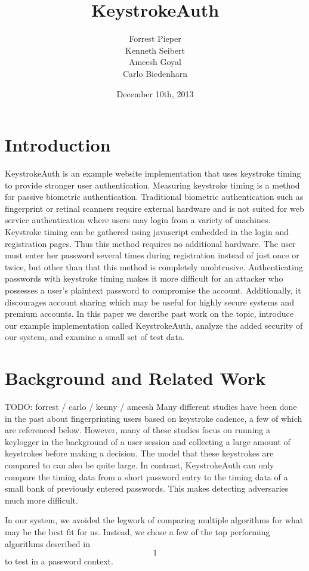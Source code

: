 \documentclass{article}
\title{KeystrokeAuth}
\author{
  Forrest Pieper\\
  Kenneth Seibert\\
  Ameesh Goyal\\
  Carlo Biedenharn
}
\date{December 10th, 2013}
\begin{document}
\maketitle

\abstract{
}

\section{Introduction}
\label{introduction}
KeystrokeAuth is an example website implementation that uses keystroke timing to provide stronger user authentication.
Measuring keystroke timing is a method for passive biometric authentication. 
Traditional biometric authentication such as fingerprint or retinal scanners require external hardware and is not suited for web service authentication where users may login from a variety of machines. 
Keystroke timing can be gathered using javascript embedded in the login and registration pages.
Thus this method requires no additional hardware.
The user must enter her password several times during registration instead of just once or twice, but other than that this method is completely unobtrusive.
Authenticating passwords with keystroke timing makes it more difficult for an attacker who possesses a user's plaintext password to compromise the account.
Additionally, it discourages account sharing which may be useful for highly secure systems and premium accounts.
In this paper we describe past work on the topic, introduce our example implementation called KeystrokeAuth, analyze the added security of our system, and examine a small set of test data.

\section{Background and Related Work}
TODO: forrest / carlo / kenny / ameesh
Many different studies have been done in the past about fingerprinting users based on keystroke cadence, a few of which are referenced below. However, many of these studies focus on running a keylogger in the background of a user session and collecting a large amount of keystrokes before making a decision. The model that these keystrokes are compared to can also be quite large. In contrast, KeystrokeAuth can only compare the timing data from a short password entry to the timing data of a small bank of previously entered passwords. This makes detecting adversaries much more difficult.

In our system, we avoided the legwork of comparing multiple algorithms for what may be the best fit for us. Instead, we chose a few of the top performing algorithms described in \[1\] to test in a password context. 
\end{document}
